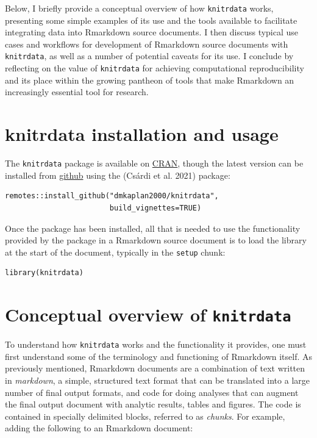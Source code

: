 Below, I briefly provide a conceptual overview of how \texttt{knitrdata} works, presenting some simple examples of its use and the tools available to facilitate integrating data into Rmarkdown source documents. I then discuss typical use cases and workflows for development of Rmarkdown source documents with \texttt{knitrdata}, as well as a number of potential caveats for its use. I conclude by reflecting on the value of \texttt{knitrdata} for achieving computational reproducibility and its place within the growing pantheon of tools that make Rmarkdown an increasingly essential tool for research.

\hypertarget{knitrdata-installation-and-usage}{%
\section{knitrdata installation and usage}\label{knitrdata-installation-and-usage}}

The \texttt{knitrdata} package is available on \href{https://cran.r-project.org/package=knitrdata}{CRAN}, though the latest version can be installed from \href{https://github.com/dmkaplan2000/knitrdata}{github} using the  (Csárdi et al. 2021) package:

\begin{verbatim}
remotes::install_github("dmkaplan2000/knitrdata",
                        build_vignettes=TRUE)
\end{verbatim}

Once the package has been installed, all that is needed to use the functionality provided by the package in a Rmarkdown source document is to load the library at the start of the document, typically in the \texttt{setup} chunk:

\begin{verbatim}
library(knitrdata)
\end{verbatim}

\hypertarget{conceptual-overview-of-knitrdata}{%
\section{\texorpdfstring{Conceptual overview of \texttt{knitrdata}}{Conceptual overview of knitrdata}}\label{conceptual-overview-of-knitrdata}}

To understand how \texttt{knitrdata} works and the functionality it provides, one must first understand some of the terminology and functioning of Rmarkdown itself. As previously mentioned, Rmarkdown documents are a combination of text written in \emph{markdown}, a simple, structured text format that can be translated into a large number of final output formats, and code for doing analyses that can augment the final output document with analytic results, tables and figures. The code is contained in specially delimited blocks, referred to as \emph{chunks}. For example, adding the following to an Rmarkdown document:

